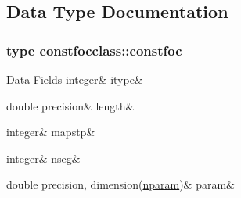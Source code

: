 \subsection{Data Type Documentation}
\label{structconstfocclass_1_1constfoc}
\subsubsection{type constfocclass\+::constfoc}
\begin{DoxyFields}{Data Fields}
\mbox{\label{namespaceconstfocclass_a6805e237c322783df518e8f2c3e1feec}} 
integer&
itype&
\\
\hline

\mbox{\label{namespaceconstfocclass_a20a95ee3a0c6fd8f128d4fbe911077db}} 
double precision&
length&
\\
\hline

\mbox{\label{namespaceconstfocclass_a7211bb49a75643cd5898f13851eb852e}} 
integer&
mapstp&
\\
\hline

\mbox{\label{namespaceconstfocclass_ad5d129a88d9e84629813d001b6379bf5}} 
integer&
nseg&
\\
\hline

\mbox{\label{namespaceconstfocclass_a91cddf45b9010e35e24ae6cd063a9ee7}} 
double precision, dimension(\mbox{\hyperlink{namespaceconstfocclass_a4a04b85ebc26340b40e7c38cfad62bc1}{nparam}})&
param&
\\
\hline

\end{DoxyFields}

